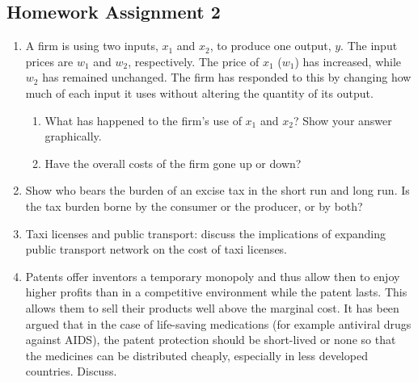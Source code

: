\documentclass{article}
\begin{document}
\subsection*{Homework Assignment 2}
\begin{enumerate}
  \item A firm is using two inputs, \(x_1\) and \(x_2\), to produce one output, \(y\). The input prices are \(w_1\) and \(w_2\), respectively. The price of \(x_1\) (\(w_1\)) has increased, while \(w_2\) has remained unchanged. The firm has responded to this by changing how much of each input it uses without altering the quantity of its output.
  \begin{enumerate}
    \item What has happened to the firm’s use of \(x_1\) and \(x_2\)? Show your answer graphically.
    \item Have the overall costs of the firm gone up or down?
  \end{enumerate}
  \item Show who bears the burden of an excise tax in the short run and long run. Is the tax burden borne by the consumer or the producer, or by both?
  \item Taxi licenses and public transport: discuss the implications of expanding public transport network on the cost of taxi licenses.
  \item Patents offer inventors a temporary monopoly and thus allow then to enjoy higher profits than in a competitive environment while the patent lasts. This allows them to sell their products well above the marginal cost. It has been argued that in the case of life-saving medications (for example antiviral drugs against AIDS), the patent protection should be short-lived or none so that the medicines can be distributed cheaply, especially in less developed countries. Discuss.
\end{enumerate}
\nocite{Valrian_Inter_Micro}
\printbibliography
\end{document}
